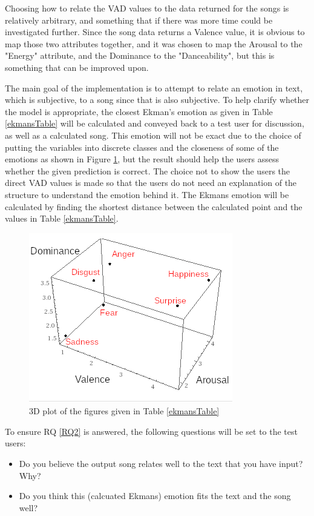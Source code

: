 Choosing how to relate the VAD values to the data returned for the songs is relatively arbitrary, and something that if there was more time could be investigated further. Since the song data returns a Valence value, it is obvious to map those two attributes together, and it was chosen to map the Arousal to the "Energy" attribute, and the Dominance to the "Danceability", but this is something that can be improved upon.

The main goal of the implementation is to attempt to relate an emotion in text, which is subjective, to a song since that is also subjective. To help clarify whether the model is appropriate, the closest Ekman's emotion as given in Table \ref{ekmansTable} will be calculated and conveyed back to a test user for discussion, as well as a calculated song. This emotion will not be exact due to the choice of putting the variables into discrete classes and the closeness of some of the emotions as shown in Figure \ref{ekmans:graph}, but the result should help the users assess whether the given prediction is correct. The choice not to show the users the direct VAD values is made so that the users do not need an explanation of the structure to understand the emotion behind it. The Ekmans emotion will be calculated by finding the shortest distance between the calculated point and the values in Table \ref{ekmansTable}.

\begin{figure}[ht]
\centering
\includegraphics[scale=2]{litImgs/Ekmans3d.png}
\caption{3D plot of the figures given in Table \ref{ekmansTable}}
\label{ekmans:graph}
\end{figure}


To ensure RQ \ref{RQ2} is answered, the following questions will be set to the test users:

\begin{itemize}
    \item Do you believe the output song relates well to the text that you have input? Why?
    \item Do you think this (calcuated Ekmans) emotion fits the text and the song well?
\end{itemize}